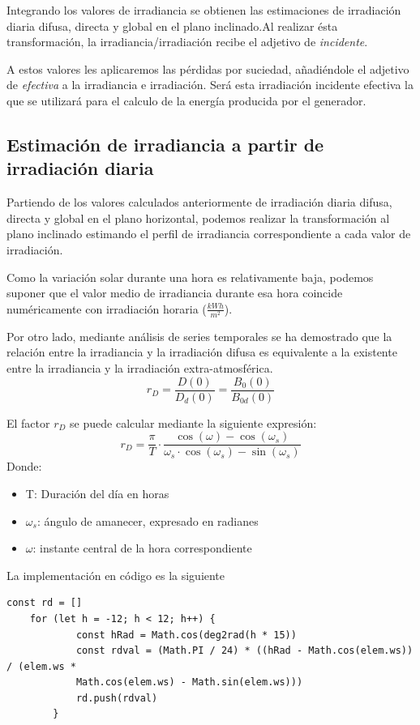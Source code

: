 Integrando los valores de irradiancia se obtienen las estimaciones de irradiación diaria difusa, directa y global en el plano inclinado.Al realizar ésta transformación, la irradiancia/irradiación recibe el adjetivo de \textit{incidente}.

A estos valores les aplicaremos las pérdidas por suciedad, añadiéndole el adjetivo de \textit{efectiva} a la irradiancia e irradiación. Será esta irradiación incidente efectiva la que se utilizará para el calculo de la energía producida por el generador.

\subsection{Estimación de irradiancia a partir de irradiación diaria}
\label{section:3.5.1}
Partiendo de los valores calculados anteriormente de irradiación diaria difusa, directa y global en el plano horizontal, podemos realizar la transformación al plano inclinado estimando el perfil de irradiancia correspondiente a cada valor de irradiación.

Como la variación solar durante una hora es relativamente baja, podemos suponer que el valor medio de irradiancia durante esa hora coincide numéricamente con irradiación horaria ($ \frac{kWh}{m^2}$).

Por otro lado, mediante análisis de series temporales se ha demostrado que la relación entre la irradiancia y la irradiación difusa es equivalente a la existente entre la irradiancia y la irradiación extra-atmosférica.
\begin{equation}
	r_D = \frac{D(0)}{D_d(0)} = \frac{B_0(0)}{B_{0d}(0)	}
\end{equation}

El factor $r_D$  se puede calcular mediante la siguiente expresión:
\begin{equation}
r_D = \frac{\pi}{T}\cdot\frac{\cos(\omega)-\cos(\omega_s)}{\omega_s\cdot\cos(\omega_s)-\sin(\omega_s)}
\end{equation}
Donde:
\begin{itemize}
\item T: Duración del día en horas
\item $\omega_s$: ángulo de amanecer, expresado en radianes
\item $\omega$: instante central de la hora correspondiente
\end{itemize}

La implementación en código es la siguiente

\begin{lstlisting}[style=ES6, caption={Cálculo de rD}]
	const rd = []
	for (let h = -12; h < 12; h++) {
			const hRad = Math.cos(deg2rad(h * 15))
			const rdval = (Math.PI / 24) * ((hRad - Math.cos(elem.ws)) / (elem.ws * 
			Math.cos(elem.ws) - Math.sin(elem.ws)))
			rd.push(rdval)
		}
\end{lstlisting}


